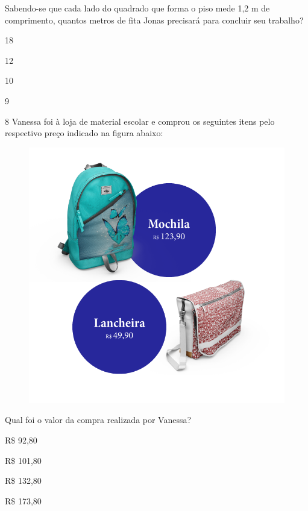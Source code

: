 Sabendo-se que cada lado do quadrado que forma o piso mede 1,2 m de
comprimento, quantos metros de fita Jonas precisará para concluir seu
trabalho?

\begin{minipage}{.5\textwidth}
\begin{escolha}
\item
  18
\item
  12
\item
  10
\item
  9
\end{escolha}
\end{minipage}

\num{8} Vanessa foi à loja de material escolar e comprou os seguintes
itens pelo respectivo preço indicado na figura abaixo:

\begin{figure}[htpb!]
\includegraphics[width=\textwidth]{../ilustracoes/MAT5/SAEB_5ANO_MAT_figura119.png}
\end{figure}

Qual foi o valor da compra realizada por Vanessa?

\begin{minipage}{.5\textwidth}
\begin{escolha}
\item
  R\$ 92,80
\item
  R\$ 101,80
\item
  R\$ 132,80
\item
  R\$ 173,80
\end{escolha}
\end{minipage}

